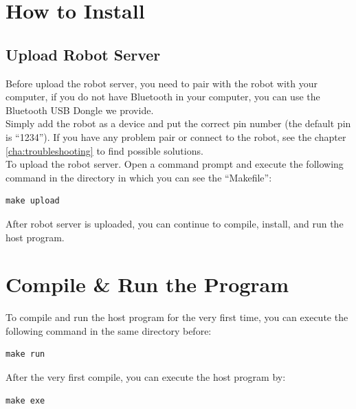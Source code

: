 \documentclass[11pt, a4paper]{report}
\begin{document}
\section{How to Install} %
\label{sec:how_to_install}


\subsection{Upload Robot Server} %
\label{sub:upload_robot_server}
Before upload the robot server, you need to pair with the robot with your computer, if you do not have Bluetooth in your computer, you can use the Bluetooth USB Dongle we provide.\\

Simply add the robot as a device and put the correct pin number (the default pin is ``1234''). If you have any problem pair or connect to the robot, see the chapter \ref{cha:troubleshooting} to find possible solutions.\\

To upload the robot server. Open a command prompt and execute the following command in the directory in which you can see the ``Makefile'':\\
\begin{lstlisting}[language={[ANSI]C}, keywordstyle=\color{blue!70}, commentstyle=\color{red!50!green!50!blue!50}, frame=shadowbox, rulesepcolor=\color{red!20!green!20!blue!20}]
make upload
\end{lstlisting}

After robot server is uploaded, you can continue to compile, install, and run the host program.\\

\section{Compile \& Run the Program} %
\label{sec:compile_&_run_the_program}

To compile and run the host program for the very first time, you can execute the following command in the same directory before:\\
\begin{lstlisting}[language={[ANSI]C}, keywordstyle=\color{blue!70}, commentstyle=\color{red!50!green!50!blue!50}, frame=shadowbox, rulesepcolor=\color{red!20!green!20!blue!20}]
make run
\end{lstlisting}

After the very first compile, you can execute the host program by:
\begin{lstlisting}[language={[ANSI]C}, keywordstyle=\color{blue!70}, commentstyle=\color{red!50!green!50!blue!50}, frame=shadowbox, rulesepcolor=\color{red!20!green!20!blue!20}]
make exe
\end{lstlisting}
\end{document}
